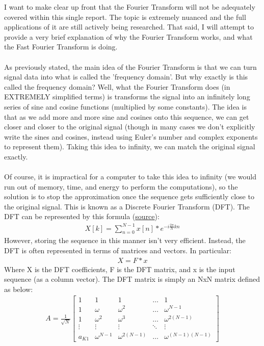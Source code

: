 \documentclass[notitlepage]{article}
\begin{document}
I want to make clear up front that the Fourier Transform will not be adequately covered
within this single report. The topic is extremely nuanced and the full applications of it
are still actively being researched. That said, I will attempt to provide a very brief explanation
of why the Fourier Transform works, and what the Fast Fourier Transform is doing.
\\\\
As previously stated, the main idea of the Fourier Transform is that we can
turn signal data into what is called the 'frequency domain'. But why exactly is
this called the frequency domain? Well, what the Fourier Transform does (in EXTREMELY
simplified terms) is transforms
the signal into an infinitely long series of sine and cosine functions (multiplied
by some constants). The idea is that as we add more and more sine and cosines onto
this sequence, we can get closer and closer to the original signal (though in many cases we
don't explicitly write the sines and cosines, instead using Euler's number and complex
exponents to represent them). Taking this idea
to infinity, we can match the original signal exactly.
\\\\
Of course, it is impractical for a computer to take this idea to infinity (we would
run out of memory, time, and energy to perform the computations), so the solution is
to stop the approximation once the sequence gets sufficiently close to the original signal.
This is known as a Discrete Fourier Transform (DFT). The DFT can be represented by this formula (\href{https://ccrma.stanford.edu/~jos/st/Matrix_Formulation_DFT.html}{source}):
\\
\begin{align*}
    X[k]=\sum_{n=0}^{N-1} x[n] * e^{-i\frac{2\pi}{N}kn}
\end{align*}
However, storing the sequence in this manner isn't very efficient. Instead,
the DFT is often represented in terms of matrices and vectors. In particular:
\begin{align*}
    X = F * x
\end{align*}
Where X is the DFT coefficients, F is the DFT matrix, and x is the input sequence (as a column vector).
The DFT matrix is simply an NxN matrix defined as below:
\begin{align*}
    A = \frac{1}{\sqrt{N}}\begin{bmatrix}
                              1      & 1            & 1               & \dots  & 1                   \\
                              1      & \omega       & \omega^2        & \dots  & \omega^{N-1}        \\
                              1      & \omega^2     & \omega^3        & \dots  & \omega^{2(N-1)}     \\
                              \vdots & \vdots       & \vdots          & \ddots & \vdots              \\
                              a_{K1} & \omega^{N-1} & \omega^{2(N-1)} & \dots  & \omega^{(N-1)(N-1)}
                          \end{bmatrix}
\end{align*}
\end{document}
